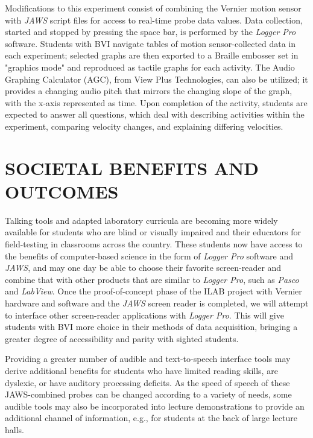 \documentclass[11.5pt]{sig-alternate} %
\begin{document}
\begin{large}
Modifications to this experiment consist of combining the Vernier motion sensor with \textit{JAWS} script files for access to real-time probe data values. Data collection, started and stopped by pressing the space bar, is performed by the \textit{Logger Pro} software. Students with BVI navigate tables of motion sensor-collected data in each experiment; selected graphs are then exported to a Braille embosser set in "graphics mode" and reproduced as tactile graphs for each activity. The Audio Graphing Calculator (AGC), from View Plus Technologies, can also be utilized; it provides a changing audio pitch that mirrors the changing slope of the graph, with the x-axis represented as time. Upon completion of the activity, students are expected to answer all questions, which deal with describing activities within the experiment, comparing velocity changes, and explaining differing velocities. 
 
\section*{SOCIETAL BENEFITS AND OUTCOMES }
 
Talking tools and adapted laboratory curricula are becoming more widely available for students who are blind or visually impaired and their educators for field-testing in classrooms across the country. These students now have access to the benefits of computer-based science in the form of \textit{Logger Pro} software and \textit{JAWS}, and may one day be able to choose their favorite screen-reader and combine that with other products that are similar to \textit{Logger Pro}, such as \textit{Pasco} and \textit{LabView}.  Once the proof-of-concept phase of the ILAB project with Vernier hardware and software and the \textit{JAWS} screen reader is completed, we will attempt to interface other screen-reader applications with \textit{Logger Pro}. This will give students with BVI more choice in their methods of data acquisition, bringing a greater degree of accessibility and parity with sighted students.  
 
Providing a greater number of audible and text-to-speech interface tools may derive additional benefits for students who have limited reading skills, are dyslexic, or have auditory processing deficits. As the speed of speech of these JAWS-combined probes can be changed according to a variety of needs, some audible tools may also be incorporated into lecture demonstrations to provide an additional channel of information, e.g., for students at the back of large lecture halls.  
 

\end{large}
\end{document}
